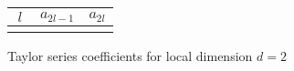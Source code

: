 \documentclass[11pt, oneside]{article}
\begin{document}
\newcommand{\dval}{2}    %
\newcommand{\ORDval}{30} %

\begin{center}
\renewcommand{\arraystretch}{1.2}
\begin{tabular}{|c|| c| c |} 
 \hline
  $\ l \ $ & $a_{2l-1}$ & $a_{2l}$  \\ [0.5ex] 
 \hline
%
\\[0.3ex]
 \hline
\end{tabular}

\bigskip

Taylor series coefficients for local dimension $d = \dval$
\end{center}
\end{document}
